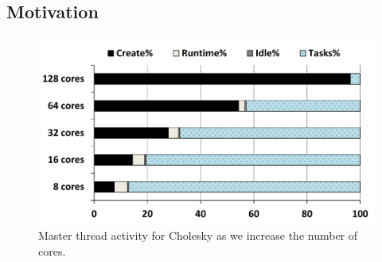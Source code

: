 \subsection{Motivation}



\begin{figure}[t!]%
	\centering
	\includegraphics[width=0.75\columnwidth]{figures/master_thread.pdf}
	\caption{Master thread activity for Cholesky as we increase the number of cores.}
	\label{fig:master_thread}%
\end{figure}

